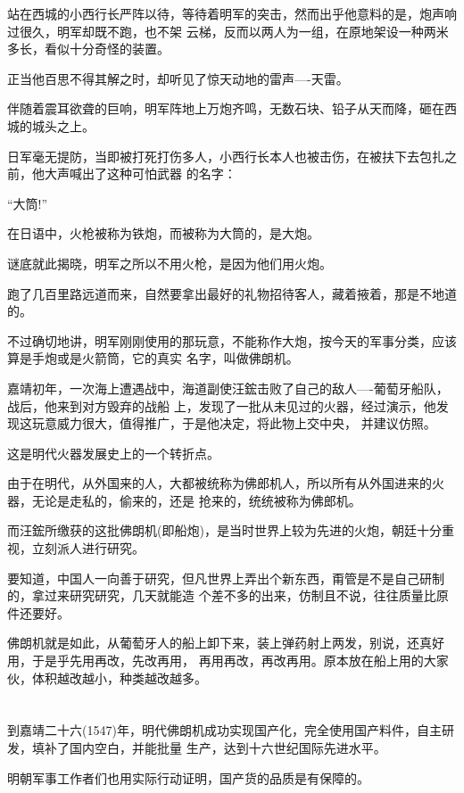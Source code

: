 \documentclass[11pt,a4paper,onecolumn]{article}
\begin{document}
站在西城的小西行长严阵以待，等待着明军的突击，然而出乎他意料的是，炮声响过很久，明军却既不跑，也不架
云梯，反而以两人为一组，在原地架设一种两米多长，看似十分奇怪的装置。

正当他百思不得其解之时，却听见了惊天动地的雷声----天雷。

伴随着震耳欲聋的巨响，明军阵地上万炮齐鸣，无数石块、铅子从天而降，砸在西城的城头之上。

日军毫无提防，当即被打死打伤多人，小西行长本人也被击伤，在被扶下去包扎之前，他大声喊出了这种可怕武器
的名字：

``大筒!''

在日语中，火枪被称为铁炮，而被称为大筒的，是大炮。

谜底就此揭晓，明军之所以不用火枪，是因为他们用火炮。

跑了几百里路远道而来，自然要拿出最好的礼物招待客人，藏着掖着，那是不地道的。

不过确切地讲，明军刚刚使用的那玩意，不能称作大炮，按今天的军事分类，应该算是手炮或是火箭筒，它的真实
名字，叫做佛朗机。

嘉靖初年，一次海上遭遇战中，海道副使汪鋐击败了自己的敌人----葡萄牙船队，战后，他来到对方毁弃的战船
上，发现了一批从未见过的火器，经过演示，他发现这玩意威力很大，值得推广，于是他决定，将此物上交中央，
并建议仿照。

这是明代火器发展史上的一个转折点。

由于在明代，从外国来的人，大都被统称为佛郎机人，所以所有从外国进来的火器，无论是走私的，偷来的，还是
抢来的，统统被称为佛郎机。

而汪鋐所缴获的这批佛朗机(即船炮)，是当时世界上较为先进的火炮，朝廷十分重视，立刻派人进行研究。

要知道，中国人一向善于研究，但凡世界上弄出个新东西，甭管是不是自己研制的，拿过来研究研究，几天就能造
个差不多的出来，仿制且不说，往往质量比原件还要好。

佛朗机就是如此，从葡萄牙人的船上卸下来，装上弹药射上两发，别说，还真好用，于是乎先用再改，先改再用，
再用再改，再改再用。原本放在船上用的大家伙，体积越改越小，种类越改越多。

\section[\thesection]{}

到嘉靖二十六(1547)年，明代佛朗机成功实现国产化，完全使用国产料件，自主研发，填补了国内空白，并能批量
生产，达到十六世纪国际先进水平。

明朝军事工作者们也用实际行动证明，国产货的品质是有保障的。
\end{document}
